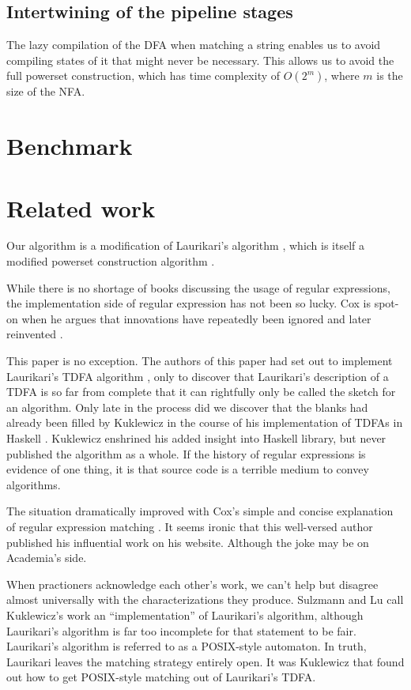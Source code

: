 \documentclass[english]{sigplanconf}
\theoremstyle{definition}
\newcommand{\del}[1]{\textcolor{red}{\sout{#1}}} %
\newcommand{\del}[1]{} %
\renewcommand{\del}[1]{} %
\begin{document}
\subsection{Intertwining of the pipeline stages}
The lazy compilation of the DFA when matching a string enables us
to avoid compiling states of it that might never be necessary. This
allows us to avoid the full powerset construction\cite{Sips05a}, which has 
time complexity of $O(2^m)$, where $m$ is the size of the NFA.

\section{Benchmark}


\section{Related work}
Our algorithm is a modification of Laurikari's algorithm \cite{laurikari2000nfas},
which is itself a modified powerset construction algorithm \cite[p. 55]{Sipser2005}.

While there is no shortage of books discussing the usage of regular
expressions, the implementation side of regular expression has not
been so lucky. Cox is spot-on when he argues that innovations have
repeatedly been ignored and later reinvented \cite{Cox07a,Cox09a,Cox10a}. 

This paper is no exception. The authors of this paper had set out
to implement Laurikari's TDFA algorithm \cite{Laur00a},
only to discover that Laurikari's description of a TDFA is so far
from complete that it can rightfully only be called the sketch for
an algorithm. Only late in the process did we discover that the blanks
had already been filled by Kuklewicz in the course of his implementation
of TDFAs in Haskell \cite{Kukl07a}. Kuklewicz enshrined his
added insight into Haskell library, but never published the algorithm
as a whole. If the history of regular expressions is evidence of one
thing, it is that source code is a terrible medium to convey algorithms. 

The situation dramatically improved with Cox's simple and concise
explanation of regular expression matching \cite{Cox07a}. It seems
ironic that this well-versed author published his influential work
on his website. Although the joke may be on Academia's side.

When \del{the taciturn} practioners acknowledge each other's work, we can't
help but disagree almost universally with the characterizations they
produce. Sulzmann and Lu \cite{Sulz12a} call Kuklewicz's
work an ``implementation'' of Laurikari's algorithm, although Laurikari's
algorithm is far too incomplete for that statement to be fair. Laurikari's
algorithm is referred to as a POSIX-style automaton. In truth, Laurikari
leaves the matching strategy entirely open. It was Kuklewicz that
found out how to get POSIX-style matching out of Laurikari's TDFA. 
\end{document}
